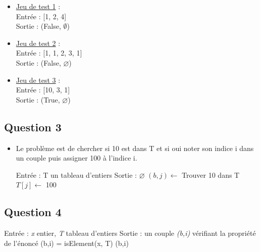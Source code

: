 \documentclass{article}
\begin{document}
\begin{itemize}
    \item \underline{Jeu de test 1} :
        \\
        Entrée : [1, 2, 4] \\
        Sortie : (False, $ \emptyset $)
    \item \underline{Jeu de test 2} :
        \\
        Entrée : [1, 1, 2, 3, 1]
        \\
        Sortie : (False, $ \varnothing $)
    \item \underline{Jeu de test 3} : 
        \\
        Entrée : [10, 3, 1]
        \\ Sortie : (True, $ \varnothing $)
\end{itemize}

\subsection{Question 3}

\begin{itemize}
    \item Le problème est de chercher si 10 est dans T et si oui noter son indice i dans un couple puis assigner 100 à l'indice i. 
    \\
    \begin{algorithm}
        \caption{Formalisme Logique de \textit{test2}}
        \begin{algorithmic}[1]
            \State Entrée : T un tableau d'entiers
            \State Sortie : $\varnothing$
            \State $(b,j) \leftarrow $ Trouver 10 dans T
                \State $ T[j] \leftarrow $ 100
            \EndIf
        \end{algorithmic}
    \end{algorithm}
\end{itemize}

\subsection{Question 4}

\begin{algorithm}
    \caption{ : $1^e$ solution}
    \begin{algorithmic}[1]
        \State Entrée : \textit{x} entier, \textit{T} tableau d'entiers
        \State Sortie : un couple \textit{(b,i)} vérifiant la propriété de l'énoncé 
            \State (b,i) = isElement(x, T)
            \State \Return (b,i)
        \EndFunction
    \end{algorithmic}
\end{algorithm}
\end{document}
